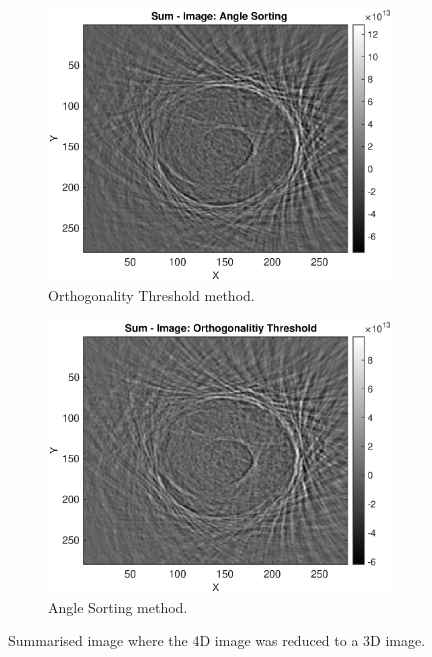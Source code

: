 \begin{figure}[H]
     \centering
     \begin{subfigure}[b]{0.49\textwidth}
         \centering
\includegraphics[width=1.12\linewidth,right]{Graphics/Results/Diff_angle_sort_orthogonality/diff_ortho_bubble_sumImmage_ortho.eps}
         \caption{Orthogonality Threshold method.}
         \label{fig:res:summareized_bubble_ortho_image_ortho}
     \end{subfigure}
     \hfill
     \begin{subfigure}[b]{0.49\textwidth}
         \centering
         \includegraphics[width=1.12\textwidth,right]{Graphics/Results/Diff_angle_sort_orthogonality/diff_ortho_bubble_sumImmage_sort.eps}
         \caption{Angle Sorting method.}
         \label{fig:res:summareized_bubble_ortho_image_bubble}
     \end{subfigure}
        \caption{Summarised image where the 4D image was reduced to a 3D image. }
        \label{fig:res:summareized_bubble_ortho_image}
\end{figure}

